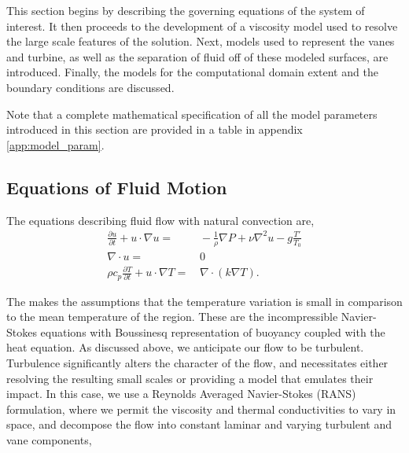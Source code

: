 This section begins by describing the governing equations of the system
of interest. It then proceeds to the development of a viscosity model
used to resolve the large scale features of the solution. Next, models
used to represent the vanes and turbine, as well as the separation of
fluid off of these modeled surfaces, are introduced.  Finally, the
models for the computational domain extent and the boundary conditions
are discussed. 

Note that a complete mathematical specification of all the model
parameters introduced in this section are provided in a table in
appendix \ref{app:model_param}.

\subsection{Equations of Fluid Motion}
\label{sub_sec:ns_en}
%
%

The equations describing fluid flow with natural convection are,
\begin{align}
  \frac{\partial u}{\partial t} + u \cdot \nabla u =& \,
  -\frac{1}{\rho}\nabla P + \nu \nabla^2 u - g \frac{T'}{T_0}\\
  \nabla \cdot u =& \, 0 \\
  \rho c_p \frac{\partial T}{\partial t} + u \cdot \nabla T =& \, \nabla \cdot ( k \nabla T).
\end{align} 

The makes the assumptions that the temperature variation is small in
comparison to the mean temperature of the region. These are the
incompressible Navier-Stokes equations with Boussinesq representation of
buoyancy coupled with the heat equation.  
%
%
%
As discussed above, we anticipate our flow to be
turbulent. Turbulence significantly alters the character of the flow,
and necessitates either resolving the resulting small scales or
providing a model that emulates their impact. In this case, we use a
Reynolds Averaged Navier-Stokes (RANS) formulation, where we 
permit the viscosity and thermal conductivities to vary in space, and
decompose the flow into constant laminar and varying turbulent and vane
components,  


